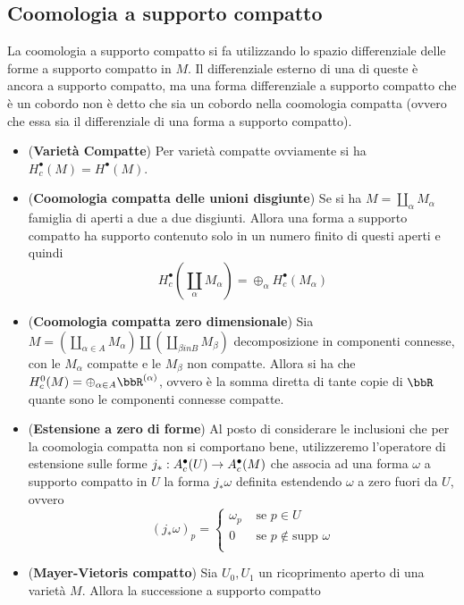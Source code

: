 \documentclass[a4paper,NoNotes,GeneralMath]{stdmdoc}
\newcommand{\supp}{\text{supp }}
\begin{document}
\subsection{Coomologia a supporto compatto}
La coomologia a supporto compatto si fa utilizzando lo spazio differenziale delle forme a supporto compatto in $M$. Il differenziale esterno di una di queste è ancora a supporto compatto, ma una forma differenziale a supporto compatto che è un cobordo non è detto che sia un cobordo nella coomologia compatta (ovvero che essa sia il differenziale di una forma a supporto compatto).

\begin{itemize}
\item ({\bf Varietà Compatte}) Per varietà compatte ovviamente si ha $H^\bullet_c (M) = H^\bullet(M)$.
\item ({\bf Coomologia compatta delle unioni disgiunte}) Se si ha $M = \coprod_\alpha M_\alpha$ famiglia di aperti a due a due disgiunti. Allora una forma a supporto compatto ha supporto contenuto solo in un numero finito di questi aperti e quindi
  $$ H^\bullet_c (\coprod_\alpha M_\alpha) = \oplus_\alpha H^\bullet_c(M_\alpha) $$
\item ({\bf Coomologia compatta zero dimensionale}) Sia $M = (\coprod_{\alpha \in A} M_\alpha) \coprod (\coprod_{\beta in B} M_\beta)$ decomposizione in componenti connesse, con le $M_\alpha$ compatte e le $M_\beta$ non compatte. Allora si ha che $H^0_c(M) = \oplus_{\alpha \in A} \bbR^{(\alpha)}$, ovvero è la somma diretta di tante copie di $\bbR$ quante sono le componenti connesse compatte.
\item ({\bf Estensione a zero di forme}) Al posto di considerare le inclusioni che per la coomologia compatta non si comportano bene, utilizzeremo l'operatore di estensione sulle forme $j_* : A^\bullet_c(U) \rightarrow A^\bullet_c(M)$ che associa ad una forma $\omega$ a supporto compatto in $U$ la forma $j_* \omega$ definita estendendo $\omega$ a zero fuori da $U$, ovvero
  \begin{displaymath}
    (j_* \omega)_p =
    \left\{
      \begin{array}{cc}
        \omega_p & \text{ se } p \in U               \\
        0        & \text{ se } p \notin \supp \omega \\
      \end{array}
    \right.
  \end{displaymath}
\item ({\bf Mayer-Vietoris compatto}) Sia $U_0, U_1$ un ricoprimento aperto di una varietà $M$. Allora la successione a supporto compatto

\end{itemize}
\end{document}
